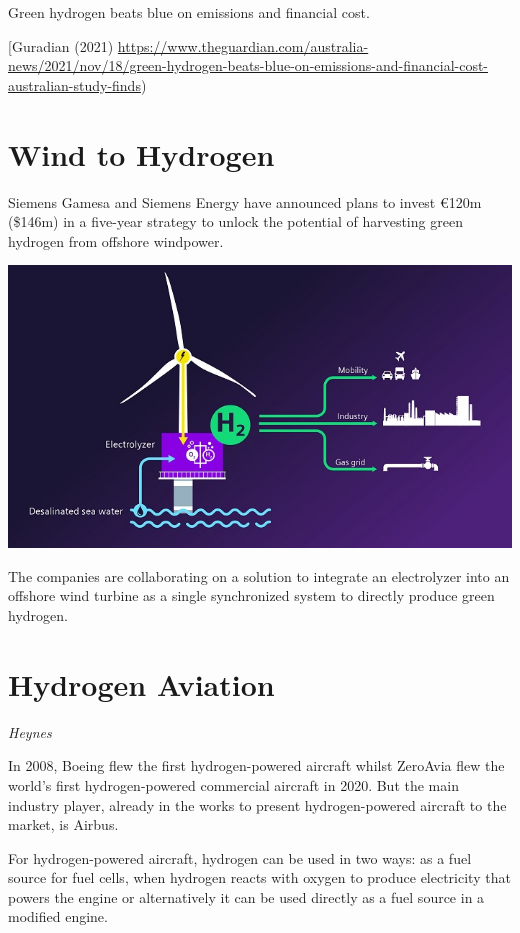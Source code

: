 \documentclass[
]{book}
\begin{document}
Green hydrogen beats blue on emissions and financial cost.

{[}Guradian (2021) \url{https://www.theguardian.com/australia-news/2021/nov/18/green-hydrogen-beats-blue-on-emissions-and-financial-cost-australian-study-finds})

\hypertarget{wind-to-hydrogen}{%
\section{Wind to Hydrogen}\label{wind-to-hydrogen}}

Siemens Gamesa and Siemens Energy have announced plans to invest €120m (\$146m)
in a five-year strategy to unlock the potential of
harvesting green hydrogen from offshore windpower.

\includegraphics{fig/Hydrogen_Offshore-Electrolysis_Siemens.jpg}

The companies are collaborating on a solution to integrate
an electrolyzer into an offshore wind turbine
as a single synchronized system to directly produce green hydrogen.

\hypertarget{hydrogen-aviation}{%
\section{Hydrogen Aviation}\label{hydrogen-aviation}}

\emph{Heynes}

In 2008, Boeing flew the first hydrogen-powered aircraft whilst ZeroAvia flew the world's first hydrogen-powered commercial aircraft in 2020. But the main industry player, already in the works to present hydrogen-powered aircraft to the market, is Airbus.

For hydrogen-powered aircraft, hydrogen can be used in two ways: as a fuel source for fuel cells, when hydrogen reacts with oxygen to produce electricity that powers the engine or alternatively it can be used directly as a fuel source in a modified engine.
\end{document}
